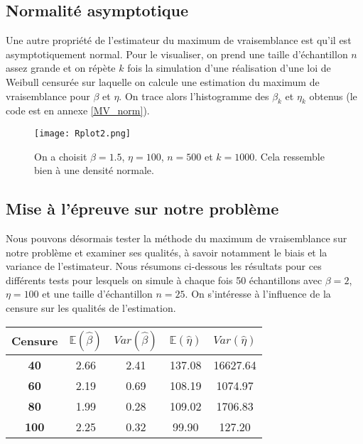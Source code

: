 \documentclass[a4paper]{report}
\begin{document}
\subsection{Normalité asymptotique}

Une autre propriété de l'estimateur du maximum de vraisemblance est qu'il est asymptotiquement normal. Pour le visualiser, on prend une taille d'échantillon $n$ assez grande et on répète $k$ fois la simulation d'une réalisation d'une loi de Weibull censurée sur laquelle on calcule une estimation du maximum de vraisemblance pour $\beta$ et $\eta$. On trace alors l'histogramme des $\beta_k$ et $\eta_k$ obtenus (le code est en annexe \ref{MV_norm}). 

\begin{figure}[!ht]
	\centering
     	\texttt{[image: Rplot2.png]}

	\caption{On a choisit $\beta=1.5$, $\eta=100$, $n=500$ et $k=1000$. Cela ressemble bien à une densité normale.}
\end{figure}

\subsection{Mise à l'épreuve sur notre problème}

Nous pouvons désormais tester la méthode du maximum de vraisemblance sur notre problème et examiner ses qualités, à savoir notamment le biais et la variance de l'estimateur. Nous résumons ci-dessous les résultats pour ces différents tests pour lesquels on simule à chaque fois 50 échantillons avec $\beta=2$, $\eta=100$ et une taille d'échantillon $n=25$. On s'intéresse à l'influence de la censure sur les qualités de l'estimation.

\begin{center}
\begin{tabular}{|c||c|c||c|c|}
	\hline
	\bf Censure &  $\mathbb{E}(\hat{\beta})$  &  $Var(\hat{\beta})$ &  $\mathbb{E}(\hat{\eta})$ &  $Var(\hat{\eta})$ \\
	\hline
	\bf 40 &2.66 & 2.41 & 137.08 &16627.64 \\
	\hline
	\bf 60 &2.19 & 0.69 & 108.19 & 1074.97\\
	\hline
	\bf 80 &1.99 & 0.28 &109.02 &1706.83 \\
	\hline
	\bf 100 &2.25 &0.32  & 99.90&  127.20\\
	\hline
\end{tabular}
\end{center}
\end{document}
